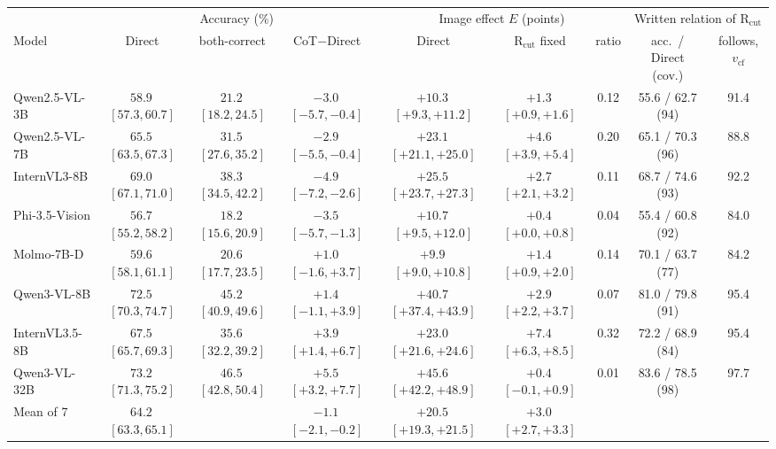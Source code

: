 \begin{tabular}{lcccccccc}
\toprule
 & \multicolumn{3}{c}{Accuracy (\%)} & \multicolumn{3}{c}{Image effect $E$ (points)} & \multicolumn{2}{c}{Written relation of R$_\mathrm{cut}$} \\
\cmidrule(lr){2-4}\cmidrule(lr){5-7}\cmidrule(lr){8-9}
Model & Direct & both-correct & CoT$-$Direct & Direct & R$_\mathrm{cut}$ fixed & ratio & acc.\ / Direct (cov.) & follows, $v_\mathrm{cf}$ \\
\midrule
Qwen2.5-VL-3B & $58.9$\,{\tiny$[57.3, 60.7]$} & $21.2$\,{\tiny$[18.2, 24.5]$} & $-3.0$\,{\tiny$[-5.7, -0.4]$} & $+10.3$\,{\tiny$[+9.3, +11.2]$} & $+1.3$\,{\tiny$[+0.9, +1.6]$} & 0.12 & 55.6 / 62.7 (94) & 91.4 \\
Qwen2.5-VL-7B & $65.5$\,{\tiny$[63.5, 67.3]$} & $31.5$\,{\tiny$[27.6, 35.2]$} & $-2.9$\,{\tiny$[-5.5, -0.4]$} & $+23.1$\,{\tiny$[+21.1, +25.0]$} & $+4.6$\,{\tiny$[+3.9, +5.4]$} & 0.20 & 65.1 / 70.3 (96) & 88.8 \\
InternVL3-8B & $69.0$\,{\tiny$[67.1, 71.0]$} & $38.3$\,{\tiny$[34.5, 42.2]$} & $-4.9$\,{\tiny$[-7.2, -2.6]$} & $+25.5$\,{\tiny$[+23.7, +27.3]$} & $+2.7$\,{\tiny$[+2.1, +3.2]$} & 0.11 & 68.7 / 74.6 (93) & 92.2 \\
Phi-3.5-Vision & $56.7$\,{\tiny$[55.2, 58.2]$} & $18.2$\,{\tiny$[15.6, 20.9]$} & $-3.5$\,{\tiny$[-5.7, -1.3]$} & $+10.7$\,{\tiny$[+9.5, +12.0]$} & $+0.4$\,{\tiny$[+0.0, +0.8]$} & 0.04 & 55.4 / 60.8 (92) & 84.0 \\
Molmo-7B-D & $59.6$\,{\tiny$[58.1, 61.1]$} & $20.6$\,{\tiny$[17.7, 23.5]$} & $+1.0$\,{\tiny$[-1.6, +3.7]$} & $+9.9$\,{\tiny$[+9.0, +10.8]$} & $+1.4$\,{\tiny$[+0.9, +2.0]$} & 0.14 & 70.1 / 63.7 (77) & 84.2 \\
Qwen3-VL-8B & $72.5$\,{\tiny$[70.3, 74.7]$} & $45.2$\,{\tiny$[40.9, 49.6]$} & $+1.4$\,{\tiny$[-1.1, +3.9]$} & $+40.7$\,{\tiny$[+37.4, +43.9]$} & $+2.9$\,{\tiny$[+2.2, +3.7]$} & 0.07 & 81.0 / 79.8 (91) & 95.4 \\
InternVL3.5-8B & $67.5$\,{\tiny$[65.7, 69.3]$} & $35.6$\,{\tiny$[32.2, 39.2]$} & $+3.9$\,{\tiny$[+1.4, +6.7]$} & $+23.0$\,{\tiny$[+21.6, +24.6]$} & $+7.4$\,{\tiny$[+6.3, +8.5]$} & 0.32 & 72.2 / 68.9 (84) & 95.4 \\
\midrule
Qwen3-VL-32B & $73.2$\,{\tiny$[71.3, 75.2]$} & $46.5$\,{\tiny$[42.8, 50.4]$} & $+5.5$\,{\tiny$[+3.2, +7.7]$} & $+45.6$\,{\tiny$[+42.2, +48.9]$} & $+0.4$\,{\tiny$[-0.1, +0.9]$} & 0.01 & 83.6 / 78.5 (98) & 97.7 \\
\midrule
Mean of 7 & $64.2$\,{\tiny$[63.3, 65.1]$} & & $-1.1$\,{\tiny$[-2.1, -0.2]$} & $+20.5$\,{\tiny$[+19.3, +21.5]$} & $+3.0$\,{\tiny$[+2.7, +3.3]$} & & & \\
\bottomrule
\end{tabular}

